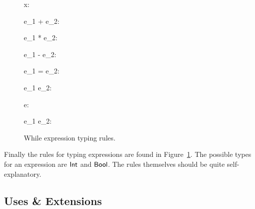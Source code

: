 \begin{figure}[h]
  \begin{multicols}{3}


  \end{multicols}

  \RuleSpace

  {\Gamma \vdash x: \tau}

  \RuleSpace

  {\Gamma \vdash e_1 + e_2: \WhInt}

  \RuleSpace

  {\Gamma \vdash e_1 * e_2: \WhInt}

  \RuleSpace

  {\Gamma \vdash e_1 - e_2: \WhInt}

  \RuleSpace 

  {\Gamma \vdash e_1 = e_2: \WhBool}

  \RuleSpace 

  {\Gamma \vdash e_1 \leq e_2: \WhBool}

  \RuleSpace

  {\Gamma \vdash \lnot e: \WhBool}

  \RuleSpace 

  {\Gamma \vdash e_1 \land e_2: \WhBool}

  \caption{While expression typing rules.}
  \label{fig:while_expr_tpe}
\end{figure}

Finally the rules for typing expressions are found in
Figure~\ref{fig:while_expr_tpe}. The possible types for an expression are
$\mbox{$\mathsf{Int}$}$ and $\mbox{$\mathsf{Bool}$}$. The rules themselves should be quite self-explanatory.


\subsection{Uses \& Extensions}
\label{sub:uses_and_extensions}

